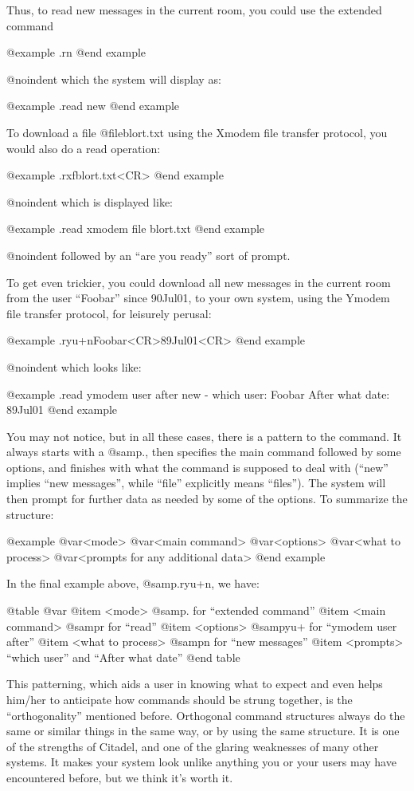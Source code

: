Thus, to read new messages in the current room, you
could use the extended command

@example
.rn
@end example

@noindent
which the system will display as:

@example
.read new
@end example

To download a file @file{blort.txt} using the Xmodem file transfer
protocol, you would also do a read operation:

@example
.rxfblort.txt<CR>
@end example

@noindent
which is displayed like:

@example
.read xmodem file blort.txt
@end example

@noindent
followed by an ``are you ready'' sort of prompt.

To get even trickier, you could download all new messages
in the current room from the user ``Foobar'' since 90Jul01, to
your own system, using the Ymodem file transfer protocol, for
leisurely perusal:

@example
.ryu+nFoobar<CR>89Jul01<CR>
@end example

@noindent
which looks like:

@example
.read ymodem user after new - which user: Foobar
After what date: 89Jul01
@end example

You may not notice, but in all these cases, there is a
pattern to the command.  It always starts with a @samp{.}, then
specifies the main command followed by some options, and
finishes with what the command is supposed to deal with
(``new'' implies ``new messages'', while ``file'' explicitly means
``files'').  The system will then prompt for further data as
needed by some of the options.  To summarize the structure:

@example
@var{<mode>} @var{<main command>} @var{<options>} @var{<what to process>}
@var{<prompts for any additional data>}
@end example

In the final example above, @samp{.ryu+n}, we have:

@table @var
@item <mode>
@samp{.} for ``extended command''
@item <main command>
@samp{r} for ``read''
@item <options>
@samp{yu+} for ``ymodem user after''
@item <what to process>
@samp{n} for ``new messages''
@item <prompts>
``which user'' and ``After what date''
@end table

This patterning, which aids a user in knowing what
to expect and even helps him/her to anticipate how commands
should be strung together, is the ``orthogonality'' mentioned
before.  Orthogonal command structures always do the same
or similar things in the same way, or by using the same
structure.  It is one of the strengths of Citadel, and one
of the glaring weaknesses of many other systems.  It makes
your system look unlike anything you or your users may have
encountered before, but we think it's worth it.
